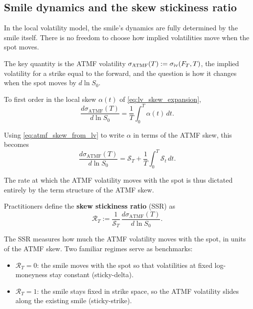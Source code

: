 \subsection{Smile dynamics and the skew stickiness ratio}\label{sec:ssr}

In the local volatility model, the smile's dynamics are fully determined by the smile itself.
There is no freedom to choose how implied volatilities move when the spot moves.

The key quantity is the ATMF volatility $\sigma_{\mathrm{ATMF}}(T) := \sigma_{\mathrm{iv}}(F_T, T)$,
the implied volatility for a strike equal to the forward,
and the question is how it changes when the spot moves by $d\ln S_0$.

To first order in the local skew $\alpha(t)$ of \eqref{eq:lv_skew_expansion},
\begin{equation}\label{eq:atmf_vol_move}
    \frac{d\sigma_{\mathrm{ATMF}}(T)}{d\ln S_0}
    = \frac{1}{T}\int_0^T \alpha(t)\,dt .
\end{equation}

Using \eqref{eq:atmf_skew_from_lv} to write $\alpha$ in terms of the ATMF skew,
this becomes \cite[Ch. 2]{bergomi_stochastic_vol}
\begin{equation}\label{eq:atmf_vol_move_skew}
    \frac{d\sigma_{\mathrm{ATMF}}(T)}{d\ln S_0}
    = \mathcal{S}_T + \frac{1}{T}\int_0^T \mathcal{S}_t\,dt .
\end{equation}

The rate at which the ATMF volatility moves with the spot is thus dictated entirely
by the term structure of the ATMF skew.

Practitioners define the \textbf{skew stickiness ratio} (SSR) as
\begin{equation}\label{eq:ssr}
    \mathcal{R}_T := \frac{1}{\mathcal{S}_T}\,\frac{d\sigma_{\mathrm{ATMF}}(T)}{d\ln S_0}.
\end{equation}

The SSR measures how much the ATMF volatility moves with the spot,
in units of the ATMF skew.
Two familiar regimes serve as benchmarks:
\begin{itemize}
    \item $\mathcal{R}_T = 0$: the smile moves with the spot so that volatilities at fixed log-moneyness stay constant (sticky-delta).
    \item $\mathcal{R}_T = 1$: the smile stays fixed in strike space, so the ATMF volatility slides along the existing smile (sticky-strike).
\end{itemize}

